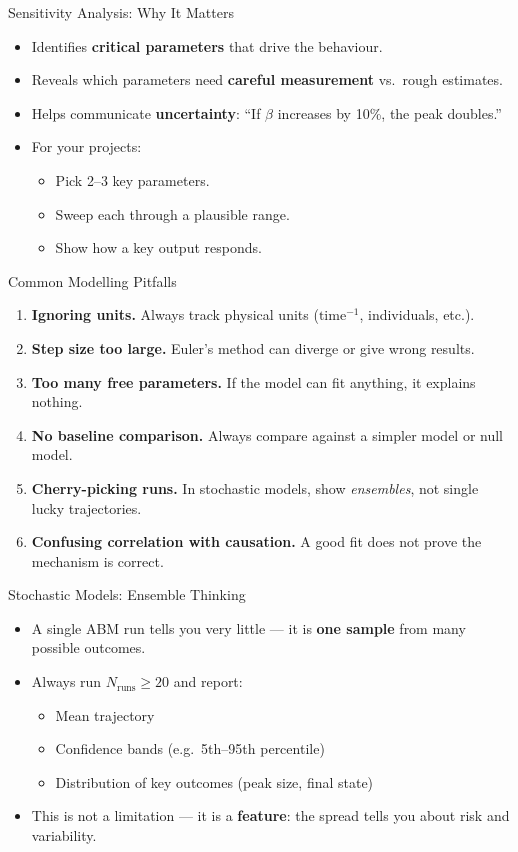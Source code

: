 \begin{frame}{Sensitivity Analysis: Why It Matters}
  \begin{itemize}
    \item Identifies \textbf{critical parameters} that drive the behaviour.
    \item Reveals which parameters need \textbf{careful measurement} vs.\ rough estimates.
    \item Helps communicate \textbf{uncertainty}: ``If $\beta$ increases by 10\%, the peak doubles.''
    \item For your projects:
    \begin{itemize}
      \item Pick 2--3 key parameters.
      \item Sweep each through a plausible range.
      \item Show how a key output responds.
    \end{itemize}
  \end{itemize}
\end{frame}

\begin{frame}{Common Modelling Pitfalls}
  \begin{enumerate}
    \item \textbf{Ignoring units.} Always track physical units ($\text{time}^{-1}$, individuals, etc.).
    \item \textbf{Step size too large.} Euler's method can diverge or give wrong results.
    \item \textbf{Too many free parameters.} If the model can fit anything, it explains nothing.
    \item \textbf{No baseline comparison.} Always compare against a simpler model or null model.
    \item \textbf{Cherry-picking runs.} In stochastic models, show \emph{ensembles}, not single lucky trajectories.
    \item \textbf{Confusing correlation with causation.} A good fit does not prove the mechanism is correct.
  \end{enumerate}
\end{frame}

\begin{frame}{Stochastic Models: Ensemble Thinking}
  \begin{itemize}
    \item A single ABM run tells you very little --- it is \textbf{one sample} from many possible outcomes.
    \item Always run $N_{\text{runs}} \geq 20$ and report:
    \begin{itemize}
      \item Mean trajectory
      \item Confidence bands (e.g.\ 5th--95th percentile)
      \item Distribution of key outcomes (peak size, final state)
    \end{itemize}
    \item This is not a limitation --- it is a \textbf{feature}: the spread tells you about risk and variability.
  \end{itemize}
\end{frame}
